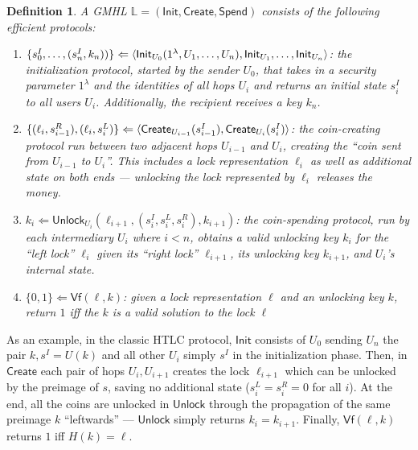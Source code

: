 \documentclass[USenglish,oneside,twocolumn]{article}
\newtheorem{definition}{Definition}[section]
\begin{document}
\begin{definition}
    A GMHL $\mathbb{L}=(\mathsf{Init}, \mathsf{Create}, \mathsf{Spend})$ consists of the following efficient protocols:
    \begin{enumerate}
        \item $\{s_0^I,\dots,(s_n^I, k_n))\} \Leftarrow\\ \langle \mathsf{Init}_{U_0}(1^\lambda, U_1,\dots,U_n), \mathsf{Init}_{U_1}, \dots, \mathsf{Init}_{U_n} \rangle$: the initialization protocol, started by the sender $U_0$, that takes in a security parameter $1^\lambda$ and the identities of all hops $U_i$ and returns an initial state $s_i^I$ to all users $U_i$. Additionally, the recipient receives a key $k_n$.
        \item $\{(\ell_i, s_{i-1}^R), (\ell_i, s^L_{i}) \} \Leftarrow \\
                  \langle \mathsf{Create}_{U_{i-1}}(s_{i-1}^I), \mathsf{Create}_{U_{i}}(s_{i}^I) \rangle$: the coin-creating protocol run between two adjacent hops $U_{i-1}$ and $U_{i}$, creating the ``coin sent from $U_{i-1}$ to $U_{i}$''. This includes a lock representation $\ell_i$ as well as additional state on both ends --- unlocking the lock represented by $\ell_i$ releases the money.
        \item $k_i \Leftarrow \mathsf{Unlock}_{U_i}(\ell_{i+1}, (s^I_i, s^L_i, s^R_i), k_{i+1})$: the coin-spending protocol, run by each intermediary $U_i$ where $i<n$, obtains a valid unlocking key $k_i$ for the ``left lock'' $\ell_i$ given its ``right lock'' $\ell_{i+1}$, its unlocking key $k_{i+1}$, and $U_i$'s internal state.
        \item $\{ 0,1 \} \Leftarrow \mathsf{Vf}(\ell, k)$: given a lock representation $\ell$ and an unlocking key $k$, return $1$ iff the $k$ is a valid solution to the lock $\ell$
    \end{enumerate}
\end{definition}

As an example, in the classic HTLC protocol, $\mathsf{Init}$ consists of $U_0$ sending $U_n$ the pair $k,s^I=U(k)$ and all other $U_i$ simply $s^I$ in the initialization phase. Then, in $\mathsf{Create}$ each pair of hops $U_i,U_{i+1}$ creates the lock $\ell_{i+1}$ which can be unlocked by the preimage of $s$, saving no additional state ($s^L_i = s^R_i = 0$ for all $i$). At the end, all the coins are unlocked in $\mathsf{Unlock}$ through the propagation of the same preimage $k$ ``leftwards'' --- $\mathsf{Unlock}$ simply returns $k_i = k_{i+1}$. Finally, $\mathsf{Vf}(\ell,k)$ returns $1$ iff $H(k) = \ell$.
\end{document}
